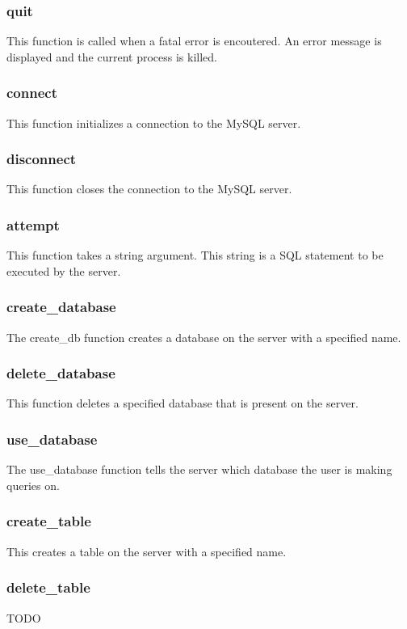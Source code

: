 \documentclass{article}
\begin{document}
\subsubsection*{quit}
This function is called when a fatal error is encoutered. An error message is displayed and the current process is killed.

\subsubsection*{connect}
This function initializes a connection to the MySQL server.

\subsubsection*{disconnect}
This function closes the connection to the MySQL server.

\subsubsection*{attempt}
This function takes a string argument. This string is a SQL statement to be executed by the server.

\subsubsection*{create\_database}
The create\_db function creates a database on the server with a specified name.

\subsubsection*{delete\_database}
This function deletes a specified database that is present on the server.

\subsubsection*{use\_database}
The use\_database function tells the server which database the user is making queries on.

\subsubsection*{create\_table}
This creates a table on the server with a specified name.

\subsubsection*{delete\_table}
TODO
\end{document}
